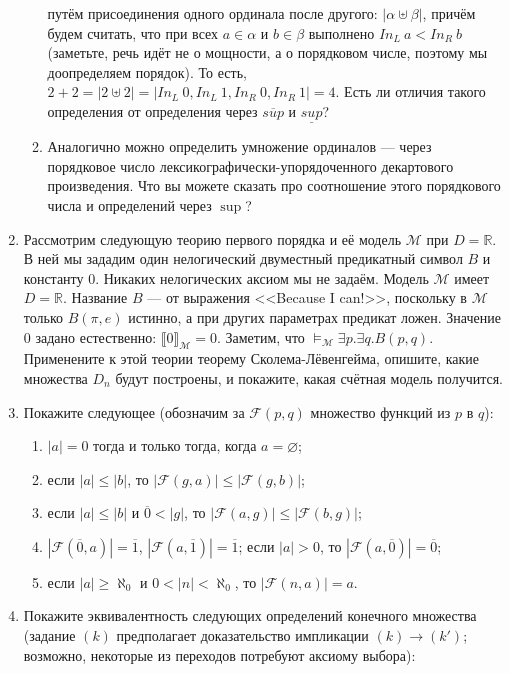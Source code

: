 \documentclass[10pt,a4paper,oneside]{article}
\begin{document}
\begin{enumerate}
\begin{enumerate}
путём присоединения одного ординала после другого: $|\alpha \uplus \beta|$, причём будем считать, что при всех $a \in \alpha$ и
$b \in \beta$ выполнено $In_L\ a<In_R\ b$ (заметьте, речь идёт не о мощности, а о порядковом числе, поэтому мы доопределяем порядок). 
То есть, $2 + 2 = |2 \uplus 2| = |In_L\ 0, In_L\ 1, In_R\ 0, In_R\ 1| = 4$. 
Есть ли отличия такого определения от определения через $\overline{sup}$ и $\underline{sup}$?
\item Аналогично можно определить умножение ординалов --- через порядковое число лексикографи\-чес\-ки-упорядоченного декартового
произведения. Что вы можете сказать про соотношение этого порядкового числа и определений через $\sup$?
\end{enumerate}
\item Рассмотрим следующую теорию первого порядка и её модель $\mathcal{M}$ при $D = \mathbb{R}$. В ней мы зададим один нелогический
двуместный предикатный символ $B$ и константу $0$. Никаких нелогических
аксиом мы не задаём. Модель $\mathcal{M}$ имеет $D = \mathbb{R}$.
Название $B$ --- от выражения <<Because I can!>>, поскольку в $\mathcal{M}$ только $B(\pi,e)$ истинно, а при других параметрах предикат ложен.
Значение 0 задано естественно: $\llbracket 0 \rrbracket_\mathcal{M} = 0$. Заметим, что $\models_\mathcal{M} \exists p.\exists q.B(p,q)$.
Применените к этой теории теорему Сколема-Лёвенгейма, опишите, какие множества $D_n$ будут построены, и покажите, 
какая счётная модель получится.
\item Покажите следующее (обозначим за $\mathcal{F}(p,q)$ множество функций из $p$ в $q$):
\begin{enumerate}
\item $|a|=0$ тогда и только тогда, когда $a = \varnothing$;
\item если $|a|\le|b|$, то $|\mathcal{F}(g,a)| \le |\mathcal{F}(g,b)|$;
\item если $|a|\le|b|$ и $\overline{0}<|g|$, то $|\mathcal{F}(a,g)| \le |\mathcal{F}(b,g)|$;
\item $|\mathcal{F}(\overline{0},a)| = \overline{1}$, $|\mathcal{F}(a,\overline{1})| = \overline{1}$; если $|a| > 0$, то $|\mathcal{F}(a,\overline{0})| = \overline{0}$;
\item если $|a|\ge\aleph_0$ и $0 < |n| < \aleph_0$, то $|\mathcal{F}(n,a)| = a$.
\end{enumerate}
\item Покажите эквивалентность следующих определений конечного множества (задание $(k)$ предполагает доказательство
импликации $(k)\rightarrow(k')$; возможно, некоторые из переходов потребуют аксиому выбора):

\end{enumerate}
\end{document}
